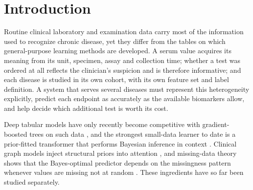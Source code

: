\section{Introduction}
Routine clinical laboratory and examination data carry most of the information used to recognize chronic disease, yet they differ from the tables on which general-purpose learning methods are developed. A serum value acquires its meaning from its unit, specimen, assay and collection time; whether a test was ordered at all reflects the clinician's suspicion and is therefore informative; and each disease is studied in its own cohort, with its own feature set and label definition. A system that serves several diseases must represent this heterogeneity explicitly, predict each endpoint as accurately as the available biomarkers allow, and help decide which additional test is worth its cost.

Deep tabular models have only recently become competitive with gradient-boosted trees on such data \cite{grinsztajn2022,gorishniy2021}, and the strongest small-data learner to date is a prior-fitted transformer that performs Bayesian inference in context \cite{tabpfn,tabpfn2}. Clinical graph models inject structural priors into attention \cite{gct}, and missing-data theory shows that the Bayes-optimal predictor depends on the missingness pattern whenever values are missing not at random \cite{littlerubin,neumiss}. These ingredients have so far been studied separately.

